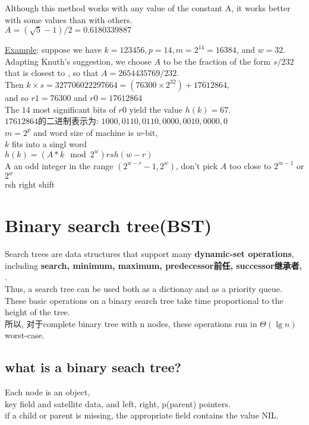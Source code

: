 \documentclass{article}
\begin{document}
Although this method works with any value of the constant A, it works better with some values than with others.\\
$A=(\sqrt{5} - 1)/2=0.6180339887$

\underline{Example}: suppose we have $k = 123456, p = 14, m = 2^{14} = 16384$, and $w = 32$. Adapting Knuth's suggestion, we choose $A$ to be the fraction of the form $s/232$ that is closest to , so that $A = 2654435769/232$. \\
Then $k \times s = 327706022297664 = (76300 \times 2^{32}) + 17612864$, \\
and so $r1 = 76300$ and $r0 = 17612864$\\
The $14$ most significant bits of $r0$ yield the value $h(k) = 67$.\\
$17612864$的二进制表示为: $1000, 0110, 0110, 0000, 0010, 0000, 0$\\
$m=2^p$ and word size of machine is $w$-bit, \\
$k$ fits into a singl word\\
$h(k)=(A*k\mod 2^w) rsh (w-r)$\\
A an odd integer in the range $(2^{w-r}-1, 2^w)$, don't pick $A$ too close to $2^{m-1}$ or $2^w$\\
rsh right shift

\section{Binary search tree(BST)}
Search trees are data structures that support many \textbf{dynamic-set operations}, including \textbf{search, minimum, maximum, predecessor前任, successor继承者, }.\\
Thus, a search tree can be used both as a dictionay and as a priority queue.\\
These basic operations on a binary search tree take time proportional to the height of the tree.\\
所以, 对于complete binary tree with n nodes, these operations run in $\Theta(\lg n)$ worst-case.

\subsection{what is a binary seach tree?}
Each node is an object, \\
key field and satellite data, and left, right, p(parent) pointers.\\
if a child or parent is missing, the appropriate field contains the value NIL.
\end{document}
